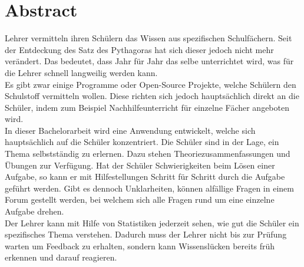 \afterpage{\blankpage}
\section*{Abstract}
Lehrer vermitteln ihren Schülern das Wissen aus spezifischen Schulfächern. Seit der Entdeckung des Satz des Pythagoras hat sich dieser jedoch nicht mehr verändert. Das bedeutet, dass Jahr für Jahr das selbe unterrichtet wird, was für die Lehrer schnell langweilig werden kann. \\

Es gibt zwar einige Programme oder Open-Source Projekte, welche Schülern den Schulstoff vermitteln wollen. Diese richten sich jedoch hauptsächlich direkt an die Schüler, indem zum Beispiel Nachhilfeunterricht für einzelne Fächer angeboten wird. \\

In dieser Bachelorarbeit wird eine Anwendung entwickelt, welche sich hauptsächlich auf die Schüler konzentriert. Die Schüler sind in der Lage, ein Thema selbstständig zu erlernen. Dazu stehen Theoriezusammenfassungen und Übungen zur Verfügung. Hat der Schüler Schwierigkeiten beim Lösen einer Aufgabe, so kann er mit Hilfestellungen Schritt für Schritt durch die Aufgabe geführt werden. Gibt es dennoch Unklarheiten, können alfällige Fragen in einem Forum gestellt werden, bei welchem sich alle Fragen rund um eine einzelne Aufgabe drehen. \\

Der Lehrer kann mit Hilfe von Statistiken jederzeit sehen, wie gut die Schüler ein spezifisches Thema verstehen. Dadurch muss der Lehrer nicht bis zur Prüfung warten um Feedback zu erhalten, sondern kann Wissenslücken bereits früh erkennen und darauf reagieren.

\newpage